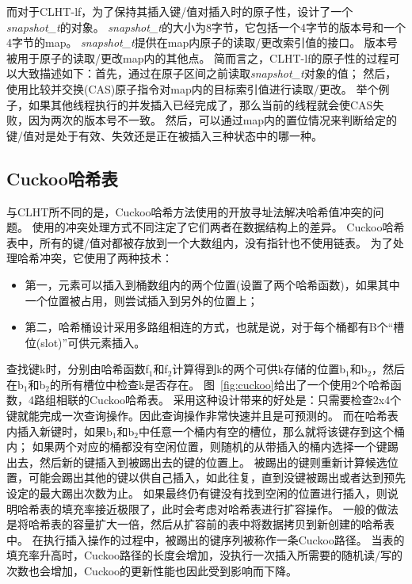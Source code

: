 而对于CLHT-lf，为了保持其插入键/值对插入时的原子性，设计了一个\textit{snapshot\_t}的对象。
\textit{snapshot\_t}的大小为8字节，它包括一个4字节的版本号和一个4字节的map。
\textit{snapshot\_t}提供在map内原子的读取/更改索引值的接口。
版本号被用于原子的读取/更改map内的其他点。
简而言之，CLHT-lf的原子性的过程可以大致描述如下：首先，通过在原子区间之前读取\textit{snapshot\_t}对象的值；
然后，使用比较并交换(CAS)原子指令对map内的目标索引值进行读取/更改。
举个例子，如果其他线程执行的并发插入已经完成了，那么当前的线程就会使CAS失败，因为两次的版本号不一致。
然后，可以通过map内的置位情况来判断给定的键/值对是处于有效、失效还是正在被插入三种状态中的哪一种。

\subsection{Cuckoo哈希表}
\label{sec:ckhash}
与CLHT所不同的是，Cuckoo哈希方法使用的开放寻址法解决哈希值冲突的问题。
使用的冲突处理方式不同注定了它们两者在数据结构上的差异。
Cuckoo哈希表中，所有的键/值对都被存放到一个大数组内，没有指针也不使用链表。
为了处理哈希冲突，它使用了两种技术：
\begin{itemize}
\item 第一，元素可以插入到桶数组内的两个位置(设置了两个哈希函数)，如果其中一个位置被占用，则尝试插入到另外的位置上；
\item 第二，哈希桶设计采用多路组相连的方式，也就是说，对于每个桶都有B个“槽位(slot)”可供元素插入。
\end{itemize}

查找键k时，分别由哈希函数f$_1$和f$_2$计算得到k的两个可供k存储的位置b$_1$和b$_2$，然后在b$_1$和b$_2$的所有槽位中检查k是否存在。
图~\ref{fig:cuckoo}给出了一个使用2个哈希函数，4路组相联的Cuckoo哈希表。
采用这种设计带来的好处是：只需要检查2x4个键就能完成一次查询操作。因此查询操作非常快速并且是可预测的。
而在哈希表内插入新键时，如果b$_1$和b$_2$中任意一个桶内有空的槽位，那么就将该键存到这个桶内；
如果两个对应的桶都没有空闲位置，则随机的从带插入的桶内选择一个键踢出去，然后新的键插入到被踢出去的键的位置上。
被踢出的键则重新计算候选位置，可能会踢出其他的键以供自己插入，如此往复，直到没键被踢出或者达到预先设定的最大踢出次数为止。
如果最终仍有键没有找到空闲的位置进行插入，则说明哈希表的填充率接近极限了，此时会考虑对哈希表进行扩容操作。
一般的做法是将哈希表的容量扩大一倍，然后从扩容前的表中将数据拷贝到新创建的哈希表中。
在执行插入操作的过程中，被踢出的键序列被称作一条Cuckoo路径。
当表的填充率升高时，Cuckoo路径的长度会增加，没执行一次插入所需要的随机读/写的次数也会增加，Cuckoo的更新性能也因此受到影响而下降。

